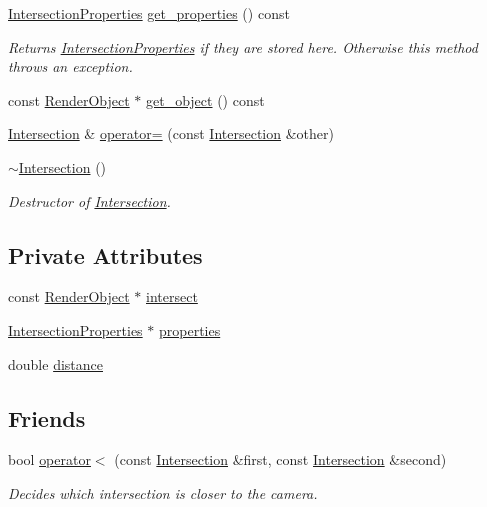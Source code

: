 \begin{DoxyCompactItemize}
\item 
\hyperlink{classIntersectionProperties}{Intersection\+Properties} \hyperlink{classIntersection_ada64d34f2099bd8436978c7dacf05f32}{get\+\_\+properties} () const 
\begin{DoxyCompactList}\small\item\em Returns \hyperlink{classIntersectionProperties}{Intersection\+Properties} if they are stored here. Otherwise this method throws an exception. \end{DoxyCompactList}\item 
const \hyperlink{classRenderObject}{Render\+Object} $\ast$ \hyperlink{classIntersection_ae2047415852535497e951e8a98deaffb}{get\+\_\+object} () const 
\item 
\hyperlink{classIntersection}{Intersection} \& \hyperlink{classIntersection_add5b6d995062799bd840c6486790c604}{operator=} (const \hyperlink{classIntersection}{Intersection} \&other)
\item 
\hyperlink{classIntersection_a064951a970ed8dd11081b2903ab62122}{$\sim$\+Intersection} ()
\begin{DoxyCompactList}\small\item\em Destructor of \hyperlink{classIntersection}{Intersection}. \end{DoxyCompactList}\end{DoxyCompactItemize}
\subsection*{Private Attributes}
\begin{DoxyCompactItemize}
\item 
const \hyperlink{classRenderObject}{Render\+Object} $\ast$ \hyperlink{classIntersection_a8241676dd0f240769dc189132dc3c5bb}{intersect}
\item 
\hyperlink{classIntersectionProperties}{Intersection\+Properties} $\ast$ \hyperlink{classIntersection_ad9d38892c2e47f51ae2497904050c00e}{properties}
\item 
double \hyperlink{classIntersection_a65da854f067b6f08175a97d262a17f1e}{distance}
\end{DoxyCompactItemize}
\subsection*{Friends}
\begin{DoxyCompactItemize}
\item 
bool \hyperlink{classIntersection_a955ab59fdb5154881d491eebc653250f}{operator$<$} (const \hyperlink{classIntersection}{Intersection} \&first, const \hyperlink{classIntersection}{Intersection} \&second)
\begin{DoxyCompactList}\small\item\em Decides which intersection is closer to the camera. \end{DoxyCompactList}\end{DoxyCompactItemize}


